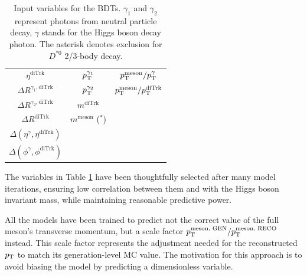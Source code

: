 \begin{myitemlist}
\begin{table}[!ht]
\begin{tabular}{|c|c|c|}
            $\eta^{\text{diTrk}}$                           &$p_\text{T}^{\gamma_1}$       &$p_\text{T}^{\text{meson}}/p_\text{T}^{\gamma}$          \\
            $\Delta R^{\gamma_1, \text{diTrk}}$             &$p_\text{T}^{\gamma_2}$       &$p_\text{T}^{\text{meson}}/p_\text{T}^{\text{diTrk}}$    \\
            $\Delta R^{\gamma_2, \text{diTrk}}$             &$m^{\text{diTrk}}$     &           \\
            $\Delta R^{\text{diTrk}}$                       &$m^{\text{meson}}$ ($^*$)  &       \\
            $\Delta(\eta^{\gamma}, \eta^{\text{diTrk}})$    & & \\
            $\Delta(\phi^{\gamma}, \phi^{\text{diTrk}})$    & & \\
            \hline
        \end{tabular}
        \caption{Input variables for the BDTs. $\gamma_1$ and $\gamma_2$ represent photons from neutral particle decay, $\gamma$ stands for the Higgs boson decay photon. The asterisk denotes exclusion for $D^{*0}$ 2/3-body decay.}
        \label{tab:model_variables}
    \end{table}
    The variables in Table \ref{tab:model_variables} have been thoughtfully selected after many model iterations, ensuring low correlation between them and with the Higgs boson invariant mass, while maintaining reasonable predictive power.

    All the models have been trained to predict not the correct value of the full meson's transverse momentum, but a scale factor $p_\text{T}^{\text{meson, GEN}}/p_\text{T}^{\text{meson, RECO}}$ instead. This scale factor represents the adjustment needed for the reconstructed $p_\text{T}$ to match its generation-level MC value. The motivation for this approach is to avoid biasing the model by predicting a dimensionless variable.




\end{myitemlist}
